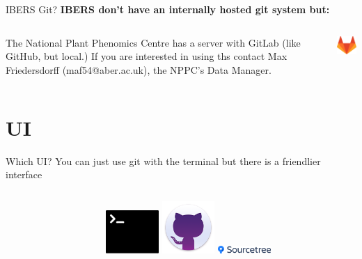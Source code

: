 \documentclass[10pt]{beamer}
\begin{document}
{\begin{frame}[fragile]{IBERS Git?}
\textbf{IBERS don't have an internally hosted git system but:} \newline \newline
\begin{columns}[T]
\begin{column}{.8\textwidth}
\alert<1>{The National Plant Phenomics Centre has a server with GitLab (like GitHub, but local.)}\pause \newline \newline
If you are interested in using ths contact Max Friedersdorff (maf54@aber.ac.uk), the NPPC's Data Manager.
\end{column}
\begin{column}{.2\textwidth}
\includegraphics[width=2cm]{Figs/GitLab}
\end{column}
\end{columns}
\end{frame}

\section{UI}



\begin{frame}[fragile]{Which UI?}
You can just use git with the terminal but there is a friendlier interface\\
\begin{columns}[T]
\begin{column}{.8\textwidth}
\end{column}
\begin{column}{.2\textwidth}
\includegraphics[width=2cm]{Figs/git/terminal} \newline \newline
\includegraphics[width=2cm]{Figs/git/gitdesktop} \newline \newline
\includegraphics[width=2cm]{Figs/git/Sourcetree}
\end{column}
\end{columns}
\end{frame}


}
\end{document}
